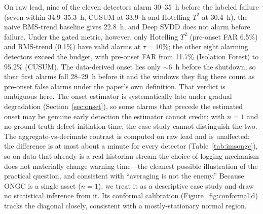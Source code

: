 \documentclass[IJPHM, 2026, 0]{PHMSociety}
\begin{document}
On raw lead, nine of the eleven detectors alarm 30--35~h before the labeled failure (seven within 34.9--35.3~h, CUSUM at 33.9~h and Hotelling $T^2$ at 30.4~h), the naive RMS-trend baseline gives 22.8~h, and Deep SVDD does not alarm before failure. Under the gated metric, however, only Hotelling $T^2$ (pre-onset FAR 6.5\%) and RMS-trend (0.1\%) have valid alarms at $\tau=10\%$; the other eight alarming detectors exceed the budget, with pre-onset FAR from 11.7\% (Isolation Forest) to 95.2\% (CUSUM). The data-derived onset lies only ${\sim}6$~h before the shutdown, so their first alarms fall 28--29~h before it and the windows they flag there count as pre-onset false alarms under the paper's own definition. That verdict is ambiguous here. The onset estimator is systematically late under gradual degradation (Section~\ref{sec:onset}), so some alarms that precede the estimated onset may be genuine early detection the estimator cannot credit; with $n=1$ and no ground-truth defect-initiation time, the case study cannot distinguish the two. The aggregate-vs-decimate contrast is computed on raw lead and is unaffected: the difference is at most about a minute for every detector (Table~\ref{tab:imsongc}), so on data that already is a real historian stream the choice of logging mechanism does not materially change warning time---the cleanest possible illustration of the practical question, and consistent with ``averaging is not the enemy.'' Because ONGC is a single asset ($n=1$), we treat it as a descriptive case study and draw no statistical inference from it. Its conformal calibration (Figure~\ref{fig:conformal}d) tracks the diagonal closely, consistent with a mostly-stationary normal region.

\end{document}
